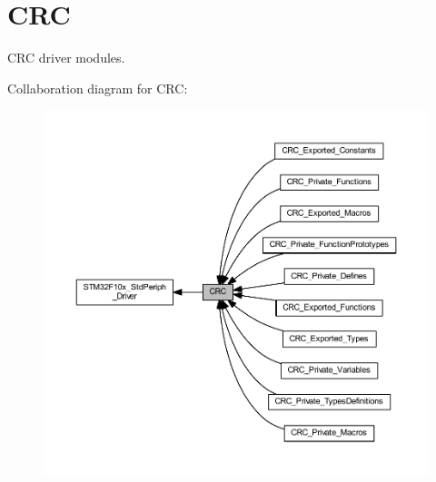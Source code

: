 \hypertarget{group___c_r_c}{}\section{C\+RC}
\label{group___c_r_c}


C\+RC driver modules.  


Collaboration diagram for C\+RC\+:
\nopagebreak
\begin{figure}[H]
\begin{center}
\leavevmode
\includegraphics[width=350pt]{group___c_r_c}
\end{center}
\end{figure}
